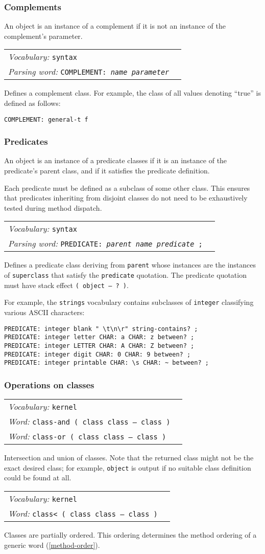 \documentclass{book}
\newcommand{\vocabulary}[1]{\emph{Vocabulary:} \texttt{#1}&\\}
\newcommand{\parsingword}[2]{\index{\texttt{#1}}\emph{Parsing word:} \texttt{#2}&\\}
\newcommand{\ordinaryword}[2]{\index{\texttt{#1}}\emph{Word:} \texttt{#2}&\\}
\newcommand{\wordtable}[1]{

\begin{tabularx}{12cm}[t]{lX}
\hline
#1
\hline
\end{tabularx}

}
\begin{document}
\subsubsection{Complements}

An object is an instance of a complement if it is not an instance of the complement's parameter.
\wordtable{
\vocabulary{syntax}
\parsingword{COMPLEMENT:}{COMPLEMENT: \emph{name} \emph{parameter}}
}
Defines a complement class. For example, the class of all values denoting ``true'' is defined as follows:
\begin{verbatim}
COMPLEMENT: general-t f
\end{verbatim}

\subsubsection{Predicates}
An object is an instance of a predicate classes if it is an instance of the predicate's parent class, and if it satisfies the predicate definition.

Each predicate must be
defined as a subclass of some other class. This ensures that predicates inheriting from disjoint classes do not need to be
exhaustively tested during method dispatch.
\wordtable{
\vocabulary{syntax}
\parsingword{PREDICATE:}{PREDICATE: \emph{parent} \emph{name} \emph{predicate} ;}
}
Defines a predicate class deriving from \texttt{parent} whose instances are the instances of \texttt{superclass} that satisfy the \texttt{predicate} quotation. The predicate quotation must have stack effect \texttt{( object -- ?~)}.

For example, the \texttt{strings} vocabulary contains subclasses of \texttt{integer}
classifying various ASCII characters:
\begin{verbatim}
PREDICATE: integer blank " \t\n\r" string-contains? ;
PREDICATE: integer letter CHAR: a CHAR: z between? ;
PREDICATE: integer LETTER CHAR: A CHAR: Z between? ;
PREDICATE: integer digit CHAR: 0 CHAR: 9 between? ;
PREDICATE: integer printable CHAR: \s CHAR: ~ between? ;
\end{verbatim}

\subsubsection{Operations on classes}
\wordtable{
\vocabulary{kernel}
\ordinaryword{class-and}{class-and ( class class -- class )}
\ordinaryword{class-or}{class-or ( class class -- class )}

}
Intersection and union of classes. Note that the returned class might not be the exact desired class; for example, \texttt{object} is output if no suitable class definition could be found at all.
\wordtable{
\vocabulary{kernel}
\ordinaryword{class<}{class< ( class class -- class )}
}
Classes are partially ordered. This ordering determines the method ordering of a generic word (\ref{method-order}).
\end{document}
